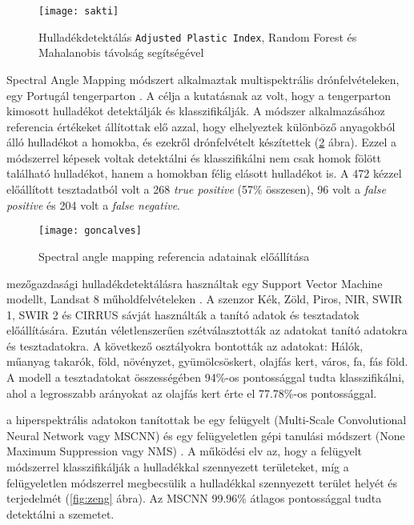\begin{figure}[H]
	\centering
	\texttt{[image: sakti]}
	\caption{Hulladékdetektálás \texttt{Adjusted Plastic Index}, Random Forest és Mahalanobis távolság segítségével \cite{sakti2023}}
    \label{fig:sakti}
\end{figure}


\citeauthor{goncalves2022} Spectral Angle Mapping módszert alkalmaztak multispektrális drónfelvételeken, egy Portugál tengerparton \cite{goncalves2022}. A célja a kutatásnak az volt, hogy a tengerparton kimosott hulladékot detektálják és klasszifikálják. A módszer alkalmazásához referencia értékeket állítottak elő azzal, hogy elhelyeztek különböző anyagokból álló hulladékot a homokba, és ezekről drónfelvételt készítettek (\ref{fig:goncalves} ábra). Ezzel a módszerrel képesek voltak detektálni és klasszifikálni nem csak homok fölött található hulladékot, hanem a homokban félig elásott hulladékot is. A 472 kézzel előállított tesztadatból volt a 268 \textit{true positive} (57\% összesen), 96 volt a \textit{false positive} és 204 volt a \textit{false negative}.

\begin{figure}[H]
	\centering
	\texttt{[image: goncalves]}
	\caption{Spectral angle mapping referencia adatainak előállítása \cite{goncalves2022}}
    \label{fig:goncalves}
\end{figure}

\citeauthor{lanorte2017} mezőgazdasági hulladékdetektálásra használtak egy Support Vector Machine modellt, Landsat 8 műholdfelvételeken \cite{lanorte2017}. A szenzor Kék, Zöld, Piros, NIR, SWIR 1, SWIR 2 és CIRRUS sávját használták a tanító adatok és tesztadatok előállítására. Ezután véletlenszerűen szétválasztották az adatokat tanító adatokra és tesztadatokra. A következő osztályokra bontották az adatokat: Hálók, műanyag takarók, föld, növényzet, gyümölcsöskert, olajfás kert, város, fa, fás föld. A modell a tesztadatokat összességében 94\%-os pontossággal tudta klasszifikálni, ahol a legrosszabb arányokat az olajfás kert érte el 77.78\%-os pontossággal.

\citeauthor{zeng2019} a hiperspektrális adatokon tanítottak be egy felügyelt (Multi-Scale Convolutional Neural Network vagy MSCNN) és egy felügyeletlen gépi tanulási módszert (None Maximum Suppression vagy NMS) \cite{zeng2019}. A működési elv az, hogy a felügyelt módszerrel klasszifikálják a hulladékkal szennyezett területeket, míg a felügyeletlen módszerrel megbecsülik a hulladékkal szennyezett terület helyét és terjedelmét (\ref{fig:zeng} ábra). Az MSCNN 99.96\% átlagos pontossággal tudta detektálni a szemetet.

